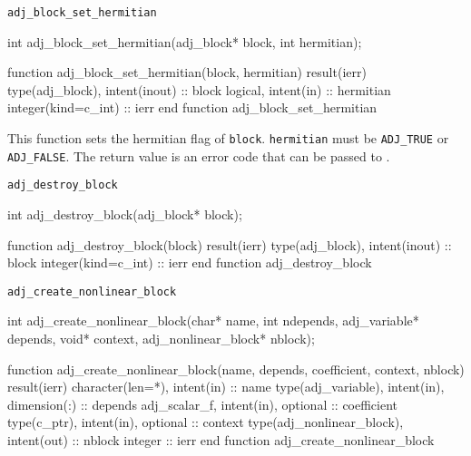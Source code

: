 \begin{boxwithtitle}{\texttt{adj_block_set_hermitian}}
\begin{minipage}{\columnwidth}
\begin{ccode}
  int adj_block_set_hermitian(adj_block* block, int hermitian);
\end{ccode}
\begin{fortrancode}
  function adj_block_set_hermitian(block, hermitian) result(ierr)
    type(adj_block), intent(inout) :: block
    logical, intent(in) :: hermitian
    integer(kind=c_int) :: ierr
  end function adj_block_set_hermitian
\end{fortrancode}
\end{minipage}
\end{boxwithtitle}
This function sets the hermitian flag of \texttt{block}. \texttt{hermitian} must be \texttt{ADJ_TRUE} or \texttt{ADJ_FALSE}.
The return value is an error code that can be passed to .


\begin{boxwithtitle}{\texttt{adj_destroy_block}}
\begin{minipage}{\columnwidth}
\begin{ccode}
  int adj_destroy_block(adj_block* block);
\end{ccode}
\begin{fortrancode}
  function adj_destroy_block(block) result(ierr) 
    type(adj_block), intent(inout) :: block
    integer(kind=c_int) :: ierr
  end function adj_destroy_block
\end{fortrancode}
\end{minipage}
\end{boxwithtitle}


\begin{boxwithtitle}{\texttt{adj_create_nonlinear_block}}
\begin{minipage}{\columnwidth}
\begin{ccode}
  int adj_create_nonlinear_block(char* name, int ndepends, adj_variable* depends, 
                                 void* context, adj_nonlinear_block* nblock);
\end{ccode}
\begin{fortrancode}
  function adj_create_nonlinear_block(name, depends, coefficient, context, nblock) 
           result(ierr)
    character(len=*), intent(in) :: name
    type(adj_variable), intent(in), dimension(:) :: depends
    adj_scalar_f, intent(in), optional :: coefficient
    type(c_ptr), intent(in), optional :: context
    type(adj_nonlinear_block), intent(out) :: nblock
    integer :: ierr
  end function adj_create_nonlinear_block
\end{fortrancode}
\end{minipage}
\end{boxwithtitle}


